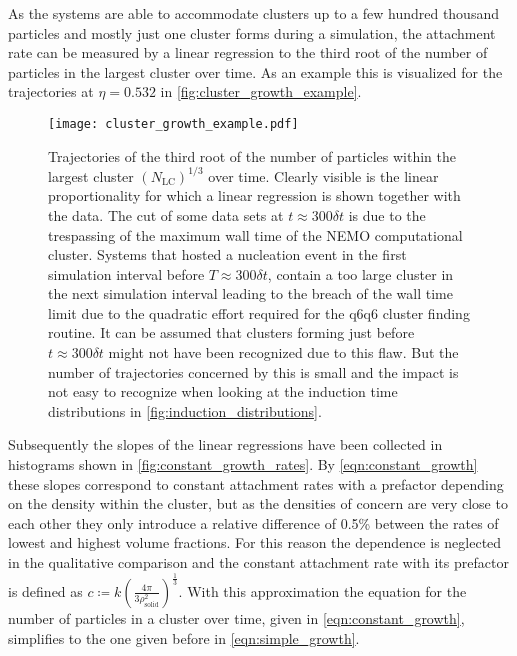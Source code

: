 As the systems are able to accommodate clusters up to a few hundred thousand particles and mostly just one cluster forms during a simulation, the attachment rate can be measured by a linear regression to the third root of the number of particles in the largest cluster over time. As an example this is visualized for the trajectories at $\eta=0.532$ in \autoref{fig:cluster_growth_example}.

\begin{figure}[h]
\centering
\texttt{[image: cluster\_growth\_example.pdf]}
\caption[Largest cluster trajectories from production data with constant attachment rates]{Trajectories of the third root of the number of particles within the largest cluster $(N_{\text{LC}})^{1/3}$ over time. Clearly visible is the linear proportionality for which a linear regression is shown together with the data. The cut of some data sets at $t \approx 300 \delta t $ is due to the trespassing of the maximum wall time of the NEMO computational cluster. Systems that hosted a nucleation event in the first simulation interval before $T \approx 300\delta t  $, contain a too large cluster in the next simulation interval leading to the breach of the wall time limit due to the quadratic effort required for the q6q6 cluster finding routine. It can be assumed that clusters forming just before $t \approx 300 \delta t$ might not have been recognized due to this flaw. But the number of trajectories concerned by this is small and the impact is not easy to recognize when looking at the induction time distributions in \autoref{fig:induction_distributions}.}
\label{fig:cluster_growth_example}
\end{figure}

Subsequently the slopes of the linear regressions have been collected in histograms shown in \autoref{fig:constant_growth_rates}. By \autoref{eqn:constant_growth} these slopes correspond to constant attachment rates with a prefactor depending on the density within the cluster, but as the densities of concern are very close to each other they only introduce a relative difference of 0.5\% between the rates of lowest and highest volume fractions. For this reason the dependence is neglected in the qualitative comparison and the constant attachment rate with its prefactor is defined as $ c \coloneqq k \left( \frac{4 \pi}{3 \rho_{\text{solid}}^2} \right)^\frac{1}{3} $. With this approximation the equation for the number of particles in a cluster over time, given in \autoref{eqn:constant_growth}, simplifies to the one given before in \autoref{eqn:simple_growth}.\\ 

